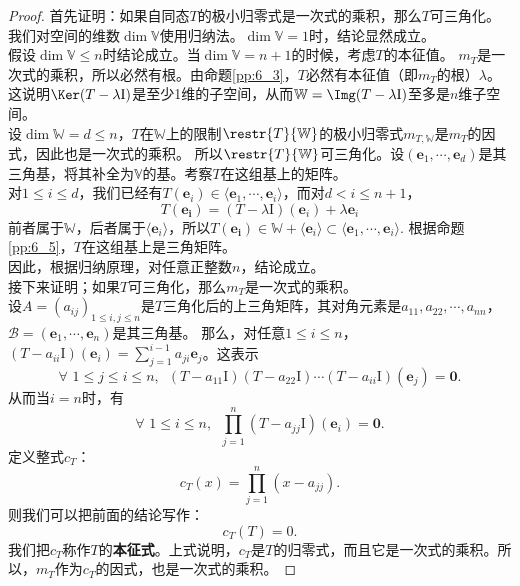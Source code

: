 \documentclass[12pt,UTF8,fontset=none]{ctexbook}
\begin{document}
\begin{proof} %
    首先证明：如果自同态$T$的极小归零式是一次式的乘积，那么$T$可三角化。\\
    我们对空间的维数$\dim \mathbb{V}$使用归纳法。$\dim \mathbb{V} = 1$时，结论显然成立。\\
    假设$\dim \mathbb{V} \leqslant n$时结论成立。当$\dim \mathbb{V} = n+1$的时候，考虑$T$的本征值。
    $m_T$是一次式的乘积，所以必然有根。由命题\ref{pp:6_3}，$T$必然有本征值（即$m_T$的根）$\lambda$。
    这说明$\Ker (T - \lambda\mathrm{I})$是至少1维的子空间，从而$\mathbb{W} = \Img (T - \lambda\mathrm{I})$至多是$n$维子空间。\\
    设$\dim \mathbb{W} = d \leqslant n$，$T$在$\mathbb{W}$上的限制$\restr{T}{\mathbb{W}}$的极小归零式$m_{T,\mathbb{W}}$是$m_T$的因式，因此也是一次式的乘积。
    所以$\restr{T}{\mathbb{W}}$可三角化。设$(\mathbf{e}_1, \cdots, \mathbf{e}_d)$是其三角基，将其补全为$\mathbb{V}$的基。考察$T$在这组基上的矩阵。\\
    对$1 \leqslant i \leqslant d$，我们已经有$T(\mathbf{e}_i) \in \langle \mathbf{e}_1, \cdots, \mathbf{e}_i\rangle$，而对$d < i \leqslant n+1$，
    $$T(\mathbf{e_i}) = (T - \lambda\mathrm{I})(\mathbf{e}_i) + \lambda \mathbf{e}_i$$
    前者属于$\mathbb{W}$，后者属于$\langle \mathbf{e}_i\rangle$，所以$T(\mathbf{e_i}) \in \mathbb{W}+\langle \mathbf{e}_i\rangle \subset  \langle \mathbf{e}_1, \cdots, \mathbf{e}_i\rangle.$
    根据命题\ref{pp:6_5}，$T$在这组基上是三角矩阵。\\
    因此，根据归纳原理，对任意正整数$n$，结论成立。\\
    接下来证明；如果$T$可三角化，那么$m_T$是一次式的乘积。\\
    设$A = (a_{ij})_{1\leqslant i, j\leqslant n}$是$T$三角化后的上三角矩阵，其对角元素是$a_{11}, a_{22}, \cdots, a_{nn}$，
    $\mathcal{B} = (\mathbf{e}_1, \cdots, \mathbf{e}_n)$是其三角基。
    那么，对任意$1\leqslant i \leqslant n$，$(T - a_{ii}\mathrm{I})(\mathbf{e}_i) = \sum_{j=1}^{i-1}a_{ji}\mathbf{e}_j$。这表示
    $$ \forall \,\,1\leqslant j \leqslant i \leqslant n, \,\,\, (T - a_{11}\mathrm{I})(T - a_{22}\mathrm{I})\cdots(T - a_{ii}\mathrm{I})(\mathbf{e}_j) = \mathbf{0}. $$
    从而当$i=n$时，有
    $$\forall \,\,1\leqslant i \leqslant n, \,\,\, \prod_{j=1}^n(T - a_{jj}\mathrm{I})(\mathbf{e}_i) = \mathbf{0}.$$
    定义整式$c_T$：
    $$
    c_T(x) = \prod_{j=1}^n(x - a_{jj}).
    $$
    则我们可以把前面的结论写作：
    $$
    c_T(T) = 0.
    $$
    我们把$c_T$称作$T$的\textbf{本征式}。上式说明，$c_T$是$T$的归零式，而且它是一次式的乘积。所以，$m_T$作为$c_T$的因式，也是一次式的乘积。 

\end{proof}
\end{document}
